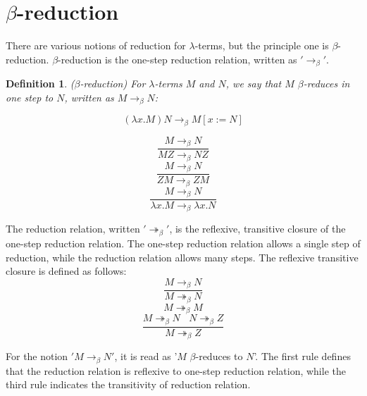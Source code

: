 \documentclass[a4paper,11pt,twoside]{report}
\newtheorem{def1}{\textbf{Definition}}[chapter]
\begin{document}
\section{$\beta$-reduction}

\noindent There are various notions of reduction for $\lambda$-terms, but the principle one is $\beta$-reduction. $\beta$-reduction is the one-step reduction relation, written as $'\rightarrow _\beta'$. 

\begin{def1}
($\beta$-reduction) For $\lambda$-terms $M$ and $N$, we say that $M$ $\beta$-reduces in one step to $N$, written as $M \rightarrow _\beta N$:
\end{def1}
\begin{equation*}
(\lambda x.M)N\rightarrow _\beta M[x:=N]
\end{equation*}

\begin{equation*}
\frac{M\rightarrow _\beta N}{MZ \rightarrow _\beta NZ}
\end{equation*}
\begin{equation*}
\frac{M\rightarrow _\beta N}{ZM \rightarrow _\beta ZM}
\end{equation*}
\begin{equation*}
\frac{M\rightarrow _\beta N}{\lambda x.M \rightarrow _\beta \lambda x.N}
\end{equation*}

\noindent The reduction relation, written $'\twoheadrightarrow _\beta'$, is the reflexive, transitive closure of the one-step reduction relation. The one-step reduction relation allows a single step of reduction, while the reduction relation allows many steps. The reflexive transitive closure is defined as follows:
\begin{equation*}
\frac{M\rightarrow _\beta N}{M \twoheadrightarrow _\beta N}
\end{equation*}
\begin{equation*}
M \twoheadrightarrow _\beta M
\end{equation*}
\begin{equation*}
\frac{M\twoheadrightarrow _\beta N\ \ \ \ N\twoheadrightarrow _\beta Z}{M \twoheadrightarrow _\beta Z}
\end{equation*}

For the notion $'M\rightarrow _\beta N'$, it is read as '$M$ $\beta$-reduces to $N$'. The first rule defines that the reduction relation is reflexive to one-step reduction relation, while the third rule indicates the transitivity of reduction relation.
\end{document}

